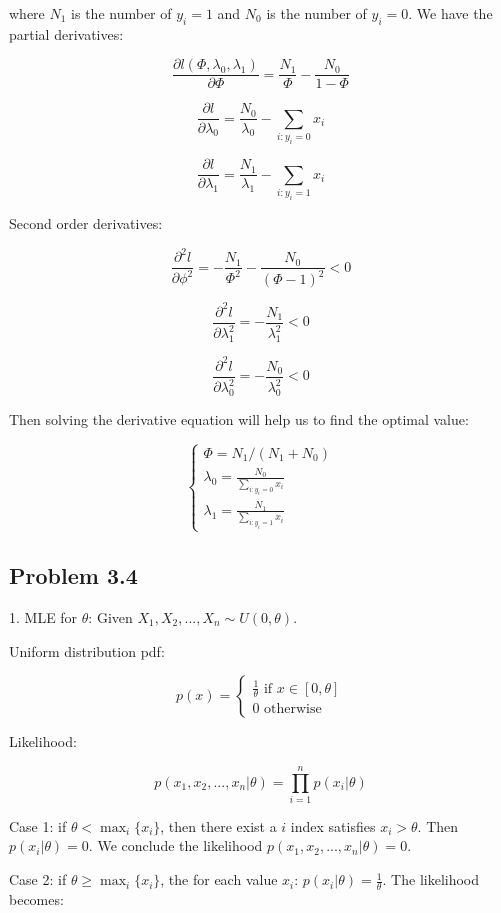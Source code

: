\documentclass{article}
\begin{document}
where $N_1$ is the number of $y_i=1$ and $N_0$ is the number of $y_i=0$. We have the partial derivatives:

$$
\frac{\partial l(\Phi,\lambda_0,\lambda_1)}{\partial \Phi}=\frac{N_1}{\Phi}-\frac{N_0}{1-\Phi}
$$

$$
\frac{\partial l}{\partial \lambda_0}=\frac{N_0}{\lambda_0}-\sum_{i:y_i=0}x_i
$$

$$
\frac{\partial l}{\partial \lambda_1}=\frac{N_1}{\lambda_1}-\sum_{i:y_i=1}x_i
$$

Second order derivatives:

$$
\frac{\partial^2 l}{\partial \phi^2} = -\frac{N_1}{\Phi^2}-\frac{N_0}{(\Phi-1)^2}<0
$$

$$
\frac{\partial^2 l}{\partial \lambda_1^2}=-\frac{N_1}{\lambda_1^2}<0
$$

$$
\frac{\partial^2 l}{\partial \lambda_0^2}=-\frac{N_0}{\lambda_0^2}<0
$$

Then solving the derivative equation will help us to find the optimal value:

$$
\begin{cases}
    \Phi = N_1/(N_1+N_0)\\
    \lambda_0 = \frac{N_0}{\sum_{i:y_i=0}x_i}\\
    \lambda_1 = \frac{N_1}{\sum_{i:y_i=1}x_i}
\end{cases}
$$

\subsection{Problem 3.4}

1. MLE for $\theta$: Given $X_1,X_2,...,X_n\sim U(0,\theta)$.

Uniform distribution pdf:

$$
p(x) =
\begin{cases}
    \frac{1}{\theta} \text{ if }x\in [0,\theta]\\
    0 \text{ otherwise }
\end{cases}
$$

Likelihood:

$$
p(x_1,x_2,...,x_n|\theta) = \prod_{i=1}^np(x_i|\theta)
$$

Case 1: if $\theta<\max_i\{x_i\}$, then there exist a $i$ index satisfies $x_i>\theta$.
Then $p(x_i|\theta)=0$. We conclude the likelihood $p(x_1,x_2,...,x_n|\theta)=0$.

Case 2: if $\theta\geq \max_i\{x_i\}$, the for each value $x_i$: $p(x_i|\theta)=\frac{1}{\theta}$.
The likelihood becomes:
\end{document}
